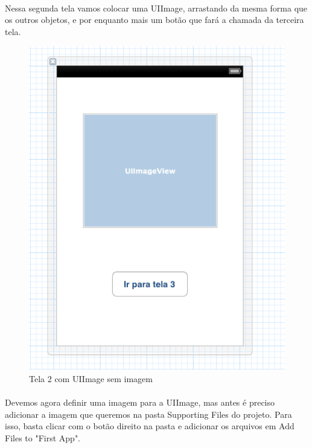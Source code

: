 \documentclass[a4paper,12pt,brazil,doubleside]{book}
\begin{document}
\paragraph{}Nessa segunda tela vamos colocar uma UIImage, arrastando da mesma forma que os outros objetos, e por enquanto mais um botão que fará a chamada da terceira tela.

\begin{figure}[h]
  \centering
  \includegraphics[totalheight=0.3\textheight]{../figuras/ios/2/xib_tela2.png}
  \caption{Tela 2 com UIImage sem imagem}
  \label{fig:a}
\end{figure}

\bigskip

\paragraph{}Devemos agora definir uma imagem para a UIImage, mas antes é preciso adicionar a imagem que queremos na pasta Supporting Files do projeto. Para isso, basta clicar com o botão direito na pasta e adicionar os arquivos em Add Files to "First App".
\end{document}

